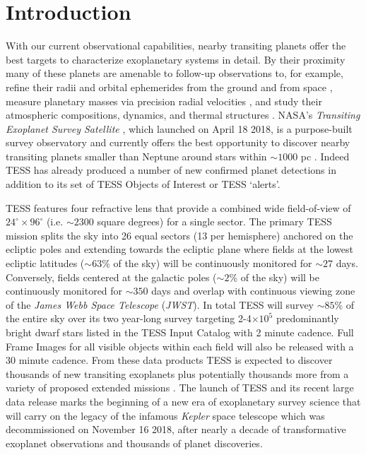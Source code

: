 \section{Introduction}
With our current observational capabilities, nearby transiting planets offer the best targets
to characterize exoplanetary systems in detail. By their proximity many of
these planets are amenable to follow-up observations to, for example, refine their radii and orbital
ephemerides from the ground \citep{stefansson17,cooke18} and from space \citep{broeg13,gaidos17},
measure planetary masses via precision radial velocities \citep{cloutier18b}, and study
their atmospheric compositions, dynamics, and thermal structures \citep{louie18,kempton18}. NASA's
\emph{Transiting Exoplanet Survey Satellite} \citep[TESS;][]{ricker15}, which launched on April 18
2018, is a purpose-built survey observatory and currently offers the best opportunity to discover
nearby transiting planets smaller than Neptune around stars within $\sim 1000$ pc \citep{stassun17}.
Indeed TESS has already produced a number of new confirmed planet detections
\citep{esposito18,gandolfi18,huang18a,trifonov18,vanderspek18} %
in addition to its set of TESS Objects of Interest or TESS `alerts'.

TESS features four refractive lens that provide a combined wide field-of-view of
$24^{\circ} \times 96^{\circ}$ (i.e. $\sim 2300$ square degrees) for a single sector. The primary
TESS mission splits the sky into 26 equal sectors (13 per hemisphere) anchored on the ecliptic
poles and extending towards the ecliptic plane where fields at the lowest ecliptic latitudes
($\sim 63$\% of the sky) will be continuously monitored for $\sim 27$ days. Conversely, fields
centered at the galactic poles ($\sim 2$\% of the sky) will be continuously monitored for
$\sim 350$ days and overlap with continuous viewing zone of the \emph{James Webb Space Telescope}
(\emph{JWST}). In total  
TESS will survey $\sim 85$\% of the entire sky over its two year-long survey targeting
2-4$\times 10^5$ predominantly bright dwarf stars listed in the TESS Input Catalog
\citep[TIC;][]{stassun17} with 2 minute cadence.
Full Frame Images for all visible objects within each field will also be released with a 30 minute
cadence. From these data products TESS
is expected to discover thousands of new transiting exoplanets 
\citep{sullivan15,ballard18,barclay18} plus potentially thousands more from a variety of proposed
extended missions \citep{bouma17,huang18b}. The launch of TESS
and its recent large data release marks the beginning of a new era of exoplanetary survey
science that will carry on the legacy of the infamous \emph{Kepler} space telescope which was
decommissioned on November 16 2018, after nearly a decade of transformative exoplanet observations
and thousands of planet discoveries.

